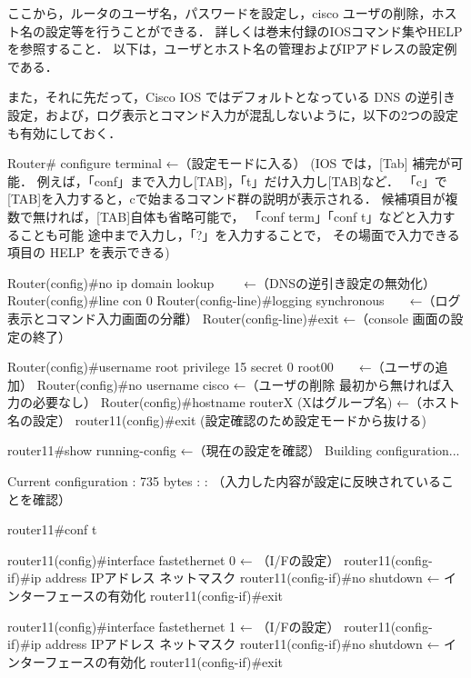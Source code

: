ここから，ルータのユーザ名，パスワードを設定し，cisco ユーザの削除，ホスト名の設定等を行うことができる．
詳しくは巻末付録のIOSコマンド集やHELPを参照すること．
以下は，ユーザとホスト名の管理およびIPアドレスの設定例である．

また，それに先だって，Cisco IOS ではデフォルトとなっている DNS の逆引き
設定，および，ログ表示とコマンド入力が混乱しないように，以下の2つの設定
も有効にしておく．
\clearpage

\begin{cli}
Router# configure terminal                                 ←（設定モードに入る）
  (IOS では，[Tab] 補完が可能．
   例えば，「conf」まで入力し[TAB]，「t」だけ入力し[TAB]など．
    「c」で[TAB]を入力すると，cで始まるコマンド群の説明が表示される．
   候補項目が複数で無ければ，[TAB]自体も省略可能で，
   「conf term」「conf t」などと入力することも可能
   途中まで入力し，「?」を入力することで，
   その場面で入力できる項目の HELP を表示できる)

Router(config)#no ip domain lookup　　               ←（DNSの逆引き設定の無効化）
Router(config)#line con 0   
Router(config-line)#logging synchronous　　←（ログ表示とコマンド入力画面の分離）
Router(config-line)#exit       ←（console 画面の設定の終了）

Router(config)#username root privilege 15 secret 0 root00　　←（ユーザの追加）
Router(config)#no username cisco                           ←（ユーザの削除
                                                   最初から無ければ入力の必要なし）
Router(config)#hostname routerX  (Xはグループ名)               ←（ホスト名の設定）
router11(config)#exit  (設定確認のため設定モードから抜ける)

router11#show running-config                                 ←（現在の設定を確認）
Building configuration...

Current configuration : 735 bytes
        :
        :
（入力した内容が設定に反映されていることを確認）

router11#conf t

router11(config)#interface fastethernet 0                ← （I/Fの設定）
router11(config-if)#ip address IPアドレス  ネットマスク
router11(config-if)#no shutdown      ← インターフェースの有効化
router11(config-if)#exit

router11(config)#interface fastethernet 1                ← （I/Fの設定）
router11(config-if)#ip address IPアドレス  ネットマスク
router11(config-if)#no shutdown      ← インターフェースの有効化
router11(config-if)#exit
\end{cli}

